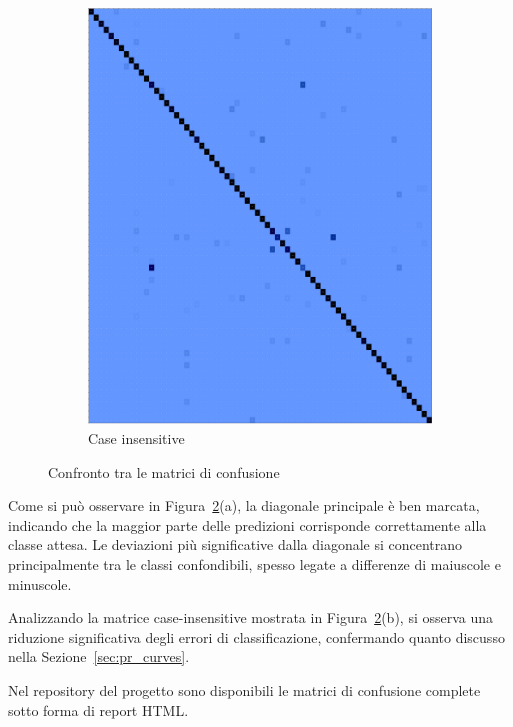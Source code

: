 \begin{figure}[htbp]
\begin{subfigure}[t]{0.25\textwidth}
        \includegraphics[width=\textwidth]{images/confusion_matrix_case.png}
        \caption{Case insensitive}
        \label{fig:confusion_matrix_case_insensitive}
    \end{subfigure}
    \caption{Confronto tra le matrici di confusione}
    \label{fig:confusion_matrices_comparison}
\end{figure}
\FloatBarrier

Come si può osservare in Figura~\ref{fig:confusion_matrices_comparison}(a), la diagonale principale è ben marcata, indicando che la maggior parte delle predizioni corrisponde correttamente alla classe attesa. Le deviazioni più significative dalla diagonale si concentrano principalmente tra le classi confondibili, spesso legate a differenze di maiuscole e minuscole.

Analizzando la matrice case-insensitive mostrata in Figura~\ref{fig:confusion_matrices_comparison}(b), si osserva una riduzione significativa degli errori di classificazione, confermando quanto discusso nella Sezione~\ref{sec:pr_curves}.


Nel repository del progetto sono disponibili le matrici di confusione complete sotto forma di report HTML.

